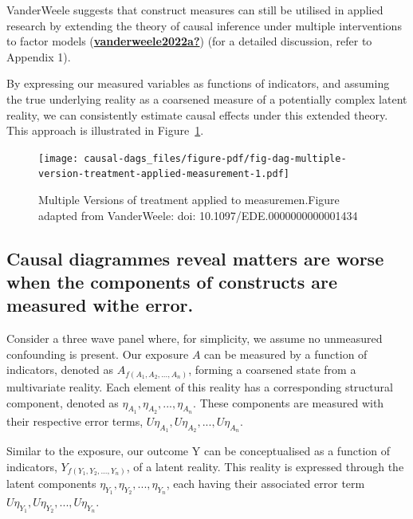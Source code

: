 \documentclass[
  singlecolumn]{report}
\begin{document}
VanderWeele suggests that construct measures can still be utilised in
applied research by extending the theory of causal inference under
multiple interventions to factor models
(\protect\hyperlink{ref-vanderweele2022a}{\textbf{vanderweele2022a?}})
(for a detailed discussion, refer to Appendix 1).

By expressing our measured variables as functions of indicators, and
assuming the true underlying reality as a coarsened measure of a
potentially complex latent reality, we can consistently estimate causal
effects under this extended theory. This approach is illustrated in
Figure~\ref{fig-dag-multiple-version-treatment-applied-measurement}.

\begin{figure}

{\centering \texttt{[image: causal-dags\_files/figure-pdf/fig-dag-multiple-version-treatment-applied-measurement-1.pdf]}

}

\caption{\label{fig-dag-multiple-version-treatment-applied-measurement}Multiple
Versions of treatment applied to measuremen.Figure adapted from
VanderWeele: doi: 10.1097/EDE.0000000000001434}

\end{figure}

\hypertarget{causal-diagrammes-reveal-matters-are-worse-when-the-components-of-constructs-are-measured-withe-error.}{%
\subsection{Causal diagrammes reveal matters are worse when the
components of constructs are measured withe
error.}\label{causal-diagrammes-reveal-matters-are-worse-when-the-components-of-constructs-are-measured-withe-error.}}

Consider a three wave panel where, for simplicity, we assume no
unmeasured confounding is present. Our exposure \(A\) can be measured by
a function of indicators, denoted as \(A_{f(A_1, A_2, ..., A_n)}\),
forming a coarsened state from a multivariate reality. Each element of
this reality has a corresponding structural component, denoted as
\(\eta_{A_1}, \eta_{A_2}, ..., \eta_{A_n}\). These components are
measured with their respective error terms,
\(U\eta_{A_1}, U\eta_{A_2}, ..., U\eta_{A_n}\).

Similar to the exposure, our outcome Y can be conceptualised as a
function of indicators, \(Y_{f(Y_1, Y_2, ..., Y_n)}\), of a latent
reality. This reality is expressed through the latent components
\(\eta_{Y_1}, \eta_{Y_2}, ..., \eta_{Y_n}\), each having their
associated error term \(U\eta_{Y_1}, U\eta_{Y_2}, ..., U\eta_{Y_n}\).
\end{document}
